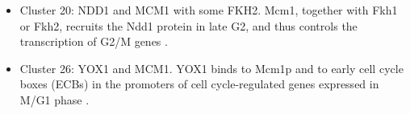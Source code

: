 \documentclass[]{article}
\begin{document}
\begin{itemize}
	\item Cluster 20: NDD1 and MCM1 with some FKH2. Mcm1, together with Fkh1 or Fkh2, recruits the Ndd1 protein in late G2, and thus controls the transcription of G2/M genes \citep{simon2001serial, koranda2000forkhead}. 
	\item Cluster 26: YOX1 and MCM1. YOX1 binds to Mcm1p and to early cell cycle boxes (ECBs) in the promoters of cell cycle-regulated genes expressed in M/G1 phase \citep{pramila2002conserved}. 
\end{itemize}
\end{document}
